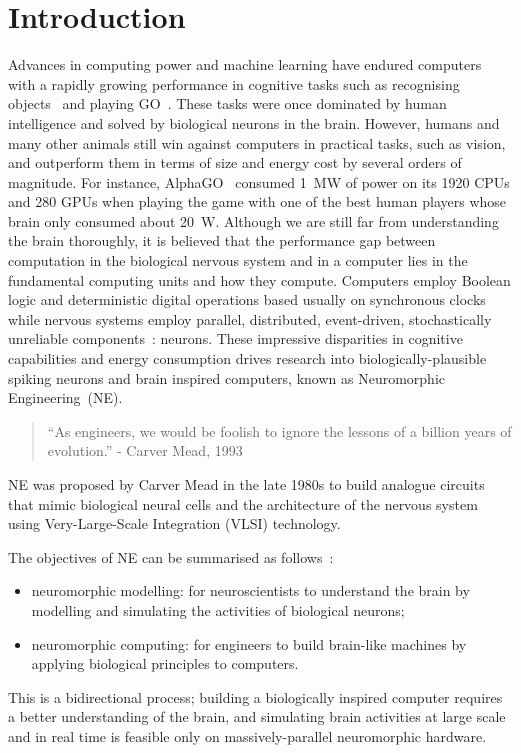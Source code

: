 \chapter{Introduction}
\label{cha:intro}
Advances in computing power and machine learning have endured computers with a rapidly growing performance in cognitive tasks such as recognising objects~\citep{deng2009imagenet} and playing GO~\citep{silver2016mastering}. 
These tasks were once dominated by human intelligence and solved by biological neurons in the brain.
However, humans and many other animals still win against computers in practical tasks, such as vision, and outperform them in terms of size and energy cost by several orders of magnitude.
For instance, AlphaGO~\citep{silver2016mastering} consumed 1~MW of power on its 1920 CPUs and 280 GPUs when playing the game with one of the best human players whose brain only consumed about 20~W.
Although we are still far from understanding the brain thoroughly, it is believed that the performance gap between computation in the biological nervous system and in a computer lies in the fundamental computing units and how they compute.
Computers employ Boolean logic and deterministic digital operations based usually on synchronous clocks while nervous systems employ parallel, distributed, event-driven, stochastically unreliable components~\citep{indiveri2009artificial}: neurons.
These impressive disparities in cognitive capabilities and energy consumption drives research into biologically-plausible spiking neurons and brain inspired computers, known as Neuromorphic Engineering~(NE).

\begin{quotation}
	``As engineers, we would be foolish to ignore the lessons of a billion years of evolution.'' - Carver Mead, 1993
\end{quotation}

NE was proposed by Carver Mead in the late 1980s \citep{Mead:1989:AVN:64998} to build analogue circuits that mimic biological neural cells and the architecture of the nervous system using Very-Large-Scale Integration (VLSI) technology.

The objectives of NE can be summarised as follows~\citep{furber2007neural}:
\begin{itemize}
	\item neuromorphic modelling: for neuroscientists to understand the brain by modelling and simulating the activities of biological neurons; 
	\item neuromorphic computing: for engineers to build brain-like machines by applying biological principles to computers.
\end{itemize}
This is a bidirectional process; building a biologically inspired computer requires a better understanding of the brain, and simulating brain activities at large scale and in real time is feasible only on massively-parallel neuromorphic hardware.

